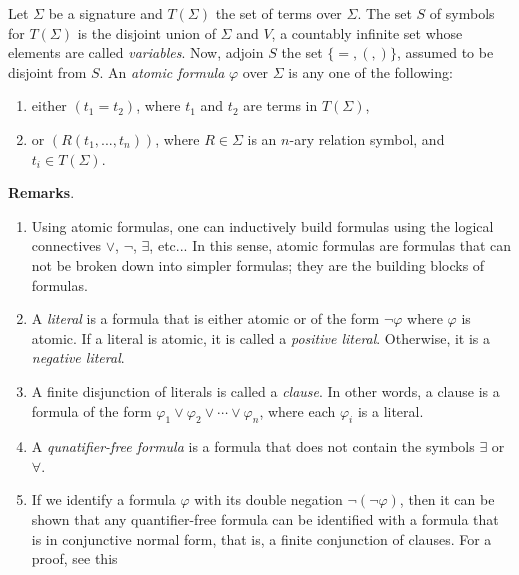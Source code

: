 \documentclass[12pt]{article}
\begin{document}
Let $\Sigma$ be a signature and $T(\Sigma)$ the set of terms over $\Sigma$.  The set $S$ of symbols for $T(\Sigma)$ is the disjoint union of $\Sigma$ and $V$, a countably infinite set whose elements are called \emph{variables}.  Now, adjoin $S$ the set $\lbrace =, (, )\rbrace$, assumed to be disjoint from $S$.  An \emph{atomic formula} $\varphi$ over $\Sigma$ is any one of the following:
\begin{enumerate}
\item either $(t_1=t_2)$, where $t_1$ and $t_2$ are terms in $T(\Sigma)$, 
\item or $(R(t_1,...,t_n))$, where $R\in\Sigma$ is an $n$-ary relation symbol, and $t_i\in T(\Sigma)$.
\end{enumerate}

\textbf{Remarks}.  
\begin{enumerate}
\item
Using atomic formulas, one can inductively build formulas using the logical connectives $\vee$, $\neg$, $\exists$, etc... In this sense, atomic formulas are formulas that can not be broken down into simpler formulas; they are the building blocks of formulas.
\item 
A \emph{literal} is a formula that is either atomic or of the form $\neg \varphi$ where $\varphi$ is atomic.  If a literal is atomic, it is called a \emph{positive literal}.  Otherwise, it is a \emph{negative literal}.
\item
A finite disjunction of literals is called a \emph{clause}.  In other words, a clause is a formula of the form $\varphi_1 \vee \varphi_2 \vee \cdots \vee \varphi_n$, where each $\varphi_i$ is a literal.
\item 
A \emph{qunatifier-free formula} is a formula that does not contain the symbols $\exists$ or $\forall$.  
\item
If we identify a formula $\varphi$ with its double negation $\neg (\neg \varphi)$, then it can be shown that any quantifier-free formula can be identified with a formula that is in conjunctive normal form, that is, a finite conjunction of clauses.  For a proof, see this 
\end{enumerate}
\end{document}
